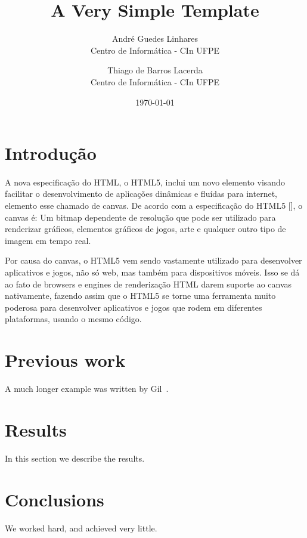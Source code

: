 \documentclass[12pt]{article}
\title{A Very Simple \LaTeXe{} Template}
\author{
        André Guedes Linhares\\
        Centro de Informática - CIn UFPE\\
            \and
        Thiago de Barros Lacerda\\
        Centro de Informática - CIn UFPE\\
}
\date{\today}
\begin{document}
\maketitle

\section{Introdução}

\paragraph{}
A nova especificação do HTML, o HTML5, inclui um novo elemento visando facilitar o desenvolvimento de aplicações
dinâmicas e fluídas para internet, elemento esse chamado de canvas. De acordo com a especificação do HTML5 [], o canvas
é:
Um bitmap dependente de resolução que pode ser utilizado para renderizar gráficos, elementos gráficos de jogos, arte e
qualquer outro tipo de imagem em tempo real.

Por causa do canvas, o HTML5 vem sendo vastamente utilizado para desenvolver aplicativos e jogos, não só web, mas também
para dispositivos móveis. Isso se dá ao fato de browsers e engines de renderização HTML darem suporte ao canvas
nativamente, fazendo assim que o HTML5 se torne uma ferramenta muito poderosa para desenvolver aplicativos e jogos que
rodem em diferentes plataformas, usando o mesmo código.

\section{Previous work}\label{previous work}
A much longer \LaTeXe{} example was written by Gil~\cite{Einstein}.

\section{Results}\label{results}
In this section we describe the results.

\section{Conclusions}\label{conclusions}
We worked hard, and achieved very little.



\end{document}
